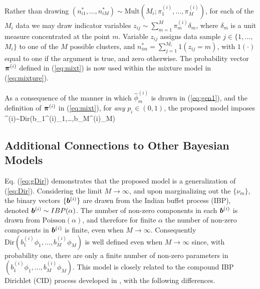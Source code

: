 \documentclass[journal]{IEEEtran}
\begin{document}
Rather than drawing $(n_{i1}^*,\dots,n_{iM}^*)\sim\mbox{Mult}(M_i;\pi_1^{(i)},\dots,\pi_M^{(i)})$, for each of the $M_i$ data we may draw indicator variables $z_{ij}\sim\sum_{m=1}^M\pi_m^{(i)}\delta_m$, where $\delta_m$ is a unit measure concentrated at the point $m$. Variable $z_{ij}$ assigns data sample $j\in\{1,\dots,$ $M_i$$\}$ to one of the $M$ possible clusters, and $n_{im}^*=\sum_{j=1}^{M_i} 1(z_{ij}=m)$, with $1(\cdot)$ equal to one if the argument is true, and zero otherwise. The probability vector $\boldsymbol{\pi}^{(i)}$ defined in (\ref{eq:mixt}) is now used within the mixture model in (\ref{eq:mixture}).


As a consequence of the manner in which $\hat{\phi}_m^{(i)}$ is drawn in (\ref{eq:gen1}), and the definition of $\boldsymbol{\pi}^{(i)}$ in (\ref{eq:mixt}), for \emph{any} $p_i\in(0,1)$, the proposed model imposes
\beq \piv^{(i)}\sim\mbox{Dir}(b_1^{(i)}{\phi}_1,\dots,b_M^{(i)}{\phi}_M) \label{eq:gDir} \eeq


\subsection{Additional Connections to Other Bayesian Models} %
\label{sub:additional_connections_to_other_bayesian_models}


Eq. (\ref{eq:gDir}) {demonstrates that } the proposed model is a generalization of (\ref{eq:Dir}). Considering the limit $M\rightarrow\infty$, and upon marginalizing out the $\{\nu_m\}$, the binary vectors $\{\boldsymbol{b}^{(i)}\}$ are drawn from the Indian buffet process (IBP), denoted $\boldsymbol{b}^{(i)}\sim\relax{IBP}(\alpha)$. The number of non-zero components in each $\boldsymbol{b}^{(i)}$ is drawn from $\mbox{Poisson}(\alpha)$, and therefore for finite $\alpha$ the number of non-zero components in $\boldsymbol{b}^{(i)}$ is finite, even when $M\rightarrow\infty$. Consequently $\mbox{Dir}(b_1^{(i)}{\phi}_1,\dots,b_M^{(i)}{\phi}_M)$ is well defined even when $M\rightarrow\infty$ since, with probability one, there are only a finite number of non-zero parameters in $(b_1^{(i)}{\phi}_1,\dots,b_M^{(i)}{\phi}_M)$. This model is closely related to the compound IBP Dirichlet (CID) process developed in \cite{compound}, with the following differences.
\end{document}
